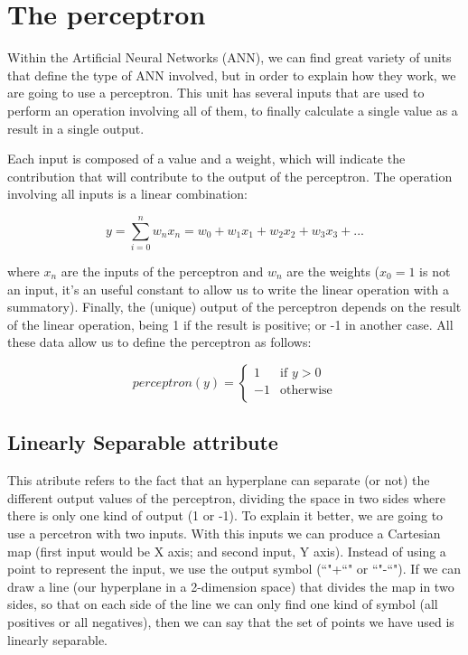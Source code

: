 \section{The perceptron}
Within the Artificial Neural Networks (ANN), we can find great variety of units that define the type of ANN involved, but in order to explain how they work, we are going to use a perceptron. This unit has several inputs that are used to perform an operation involving all of them, to finally calculate a single value as a result in a single output.

Each input is composed of a value and a weight, which will indicate the contribution that will contribute to the output of the perceptron. The operation involving all inputs is a linear combination:

\begin{equation}
    \label{linear_combination}
        y=\sum_{i=0}^{n} w_n x_n = w_0 + w_1 x_1 + w_2 x_2 + w_3 x_3 + ...%
\end{equation}

where $x_n$ are the inputs of the perceptron and $w_n$ are the weights ($x_0=1$ is not an input, it's an useful constant to allow us to write the linear operation with a summatory). Finally, the (unique) output of the perceptron depends on the result of the linear operation, being 1 if the result is positive; or -1 in another case. All these data allow us to define the perceptron as follows:

\begin{equation}
    \label{perceptron_rule}
	perceptron(y) =
		\begin{cases}
	     	1 & \text{if $y>0$} \\
	        -1 & \text{otherwise} \\
		\end{cases}
\end{equation}

	\subsection{Linearly Separable attribute}
	This atribute refers to the fact that an hyperplane can separate (or not) the different output values of the perceptron, dividing the space in two sides where there is only one kind of output (1 or -1). To explain it better, we are going to use a percetron with two inputs. With this inputs we can produce a Cartesian map (first input would be X axis; and second input, Y axis). Instead of using a point to represent the input, we use the output symbol (``"+``" or ``"-``"). If we can draw a line (our hyperplane in a 2-dimension space) that divides the map in two sides, so that on each side of the line we can only find one kind of symbol (all positives or all negatives), then we can say that the set of points we have used is linearly separable.  
	
